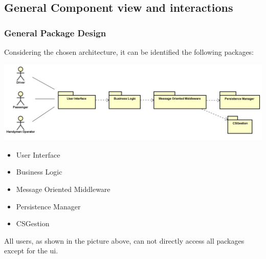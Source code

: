 \documentclass{article}
\begin{document}
		\subsection{General Component view and interactions}
			\subsubsection{General Package Design}
			Considering the chosen architecture, it can be identified the following packages:
			\begin{center}
				\includegraphics[width=0.9\linewidth]{"img/package-design"}
			\end{center}
			\begin{itemize}
				\item User Interface
				\item Business Logic
				\item Message Oriented Middleware
				\item Persistence Manager
				\item CSGestion
			\end{itemize}
			All users, as shown in the picture above, can not directly access all packages except for the ui.
\end{document}
